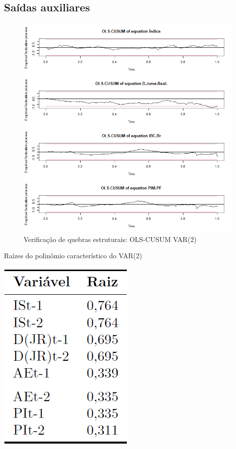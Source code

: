 
\begin{apendicesenv}

\chapter{Saídas auxiliares}

\begin{figure}[hbtp]
	\centering
	\caption{Verificação de quebras estruturais: OLS-CUSUM VAR($2$)} \label{figure:ols_cusum_model2}
	\includegraphics[scale = 0.90]{figuras/ols_cusum_model2.png}
\end{figure}

\begin{table}[hbtp]
	\centering
	\caption{Raízes do polinômio característico do VAR($2$)} \label{table:raizes_var_2}
	\includegraphics[scale = 0.50]{figuras/raizes_polinomio_caracteristico.PNG}
\end{table}


\end{apendicesenv}
